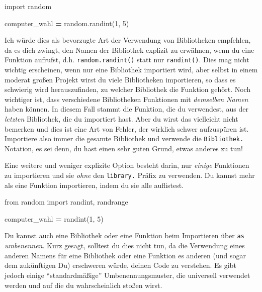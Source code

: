 \documentclass[
]{book}
\newenvironment{Shaded}{\begin{snugshade}}{\end{snugshade}}
\newcommand{\DecValTok}[1]{\textcolor[rgb]{0.00,0.00,0.81}{#1}}
\newcommand{\ImportTok}[1]{#1}
\newcommand{\NormalTok}[1]{#1}
\newcommand{\OperatorTok}[1]{\textcolor[rgb]{0.81,0.36,0.00}{\textbf{#1}}}
\begin{document}
\begin{Shaded}
\begin{Highlighting}[]
\ImportTok{import}\NormalTok{ random}

\NormalTok{computer\_wahl }\OperatorTok{=}\NormalTok{ random.randint(}\DecValTok{1}\NormalTok{, }\DecValTok{5}\NormalTok{)}
\end{Highlighting}
\end{Shaded}

Ich würde dies als bevorzugte Art der Verwendung von Bibliotheken empfehlen, da es dich zwingt, den Namen der Bibliothek explizit zu erwähnen, wenn du eine Funktion aufrufst, d.h. \texttt{random.randint()} statt nur \texttt{randint()}. Dies mag nicht wichtig erscheinen, wenn nur eine Bibliothek importiert wird, aber selbst in einem moderat großen Projekt wirst du viele Bibliotheken importieren, so dass es schwierig wird herauszufinden, zu welcher Bibliothek die Funktion gehört. Noch wichtiger ist, dass verschiedene Bibliotheken Funktionen mit \emph{demselben Namen} haben können. In diesem Fall stammt die Funktion, die du verwendest, aus der \emph{letzten} Bibliothek, die du importiert hast. Aber du wirst das vielleicht nicht bemerken und dies ist eine Art von Fehler, der wirklich schwer aufzuspüren ist. Importiere also immer die gesamte Bibliothek und verwende die \texttt{Bibliothek.} Notation, es sei denn, du hast einen sehr guten Grund, etwas anderes zu tun!

Eine weitere und weniger explizite Option besteht darin, nur \emph{einige} Funktionen zu importieren und sie \emph{ohne} den \texttt{library.} Präfix zu verwenden. Du kannst mehr als eine Funktion importieren, indem du sie alle auflistest.

\begin{Shaded}
\begin{Highlighting}[]
\ImportTok{from}\NormalTok{ random }\ImportTok{import}\NormalTok{ randint, randrange}

\NormalTok{computer\_wahl }\OperatorTok{=}\NormalTok{ randint(}\DecValTok{1}\NormalTok{, }\DecValTok{5}\NormalTok{)}
\end{Highlighting}
\end{Shaded}

Du kannst auch eine Bibliothek oder eine Funktion beim Importieren über \texttt{as} \emph{umbenennen}. Kurz gesagt, solltest du dies nicht tun, da die Verwendung eines anderen Namens für eine Bibliothek oder eine Funktion es anderen (und sogar dem zukünftigen Du) erschweren würde, deinen Code zu verstehen. Es gibt jedoch einige ``standardmäßige'' Umbenennungsmuster, die universell verwendet werden und auf die du wahrscheinlich stoßen wirst.
\end{document}
